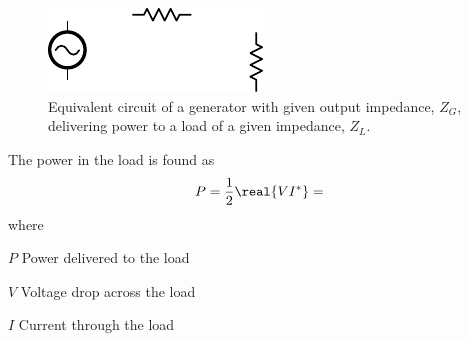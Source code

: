 \begin{figure}[htbp]
    \centering
    \includegraphics{img/analysis/generator_load}
    \caption{Equivalent circuit of a generator with given output impedance, $Z_G$, delivering power to a load of a given impedance, $Z_L$.}
    \label{fig:generator_load}
\end{figure}

The power in the load is found as \cite{pozar2011microwave}
\begin{equation}
    P = \frac{1}{2} \real{VI^*} = 
\end{equation}
where
\begin{where}
\item[$P$] Power delivered to the load
\item[$V$] Voltage drop across the load
\item[$I$] Current through the load
\end{where}





